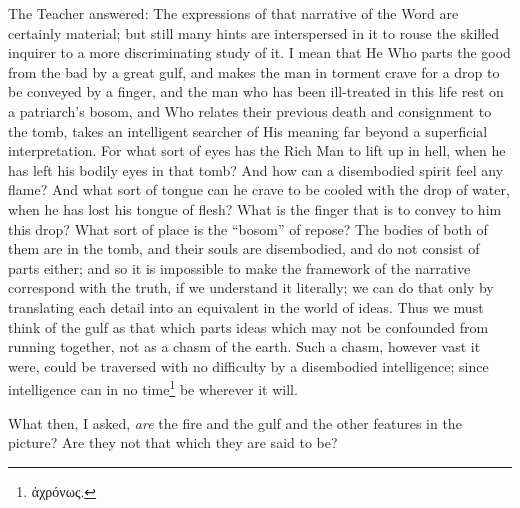 The Teacher answered: The expressions of that narrative of the Word are certainly material; but still many hints are interspersed in it to rouse the skilled inquirer to a more discriminating study of it. I mean that He Who parts the good from the bad by a great gulf, and makes the man in torment crave for a drop to be conveyed by a finger, and the man who has been ill-treated in this life rest on a patriarch’s bosom, and Who relates their previous death and consignment to the tomb, takes an intelligent searcher of His meaning far beyond a superficial interpretation. For what sort of eyes has the Rich Man to lift up in hell, when he has left his bodily eyes in that tomb? And how can a disembodied spirit feel any flame? And what sort of tongue can he crave to be cooled with the drop of water, when he has lost his tongue of flesh? What is the finger that is to convey to him this drop? What sort of place is the “bosom” of repose? The bodies of both of them are in the tomb, and their souls are disembodied, and do not consist of parts either; and so it is impossible to make the framework of the narrative correspond with the truth, if we understand it literally; we can do that only by translating each detail into an equivalent in the world of ideas. Thus we must think of the gulf as that which parts ideas which may not be confounded from running together, not as a chasm of the earth. Such a chasm, however vast it were, could be traversed with no difficulty by a disembodied intelligence; since intelligence can in no time\footnote{\textgreek{ἀχρόνως}.} be wherever it will.

What then, I asked, \emph{are} the fire and the gulf and the other features in the picture? Are they not that which they are said to be?

